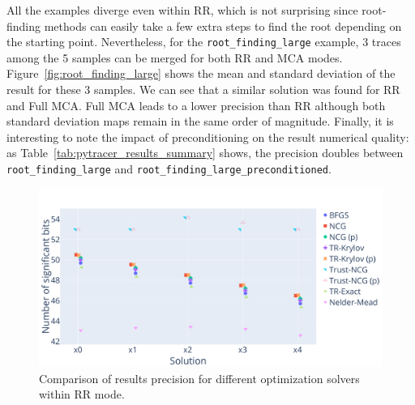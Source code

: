 All the examples diverge even within RR, which is not surprising since
root-finding methods can easily take a few extra steps to find the root
depending on the starting point. Nevertheless, for the
\texttt{root\_finding\_large} example, 3 traces among the 5 samples can be
merged for both RR and MCA modes. Figure~\ref{fig:root_finding_large} shows the
mean and standard deviation of the result for these 3 samples. We can see that a
similar solution was found for RR and Full MCA. Full MCA leads to a lower
precision than RR although both standard deviation maps remain in the same order
of magnitude. Finally, it is interesting to note the impact of preconditioning
on the result numerical quality: as Table~\ref{tab:pytracer_results_summary}
shows, the precision doubles between \texttt{root\_finding\_large} and
\texttt{root\_finding\_large\_preconditioned}.

\begin{figure}
    \centering
    \includegraphics[width=\linewidth]{figure/unconstrained_optimization_comparison.pdf}
    \caption{Comparison of results precision for different optimization solvers within RR mode.}
    \label{fig:unconstrained_optimization}
\end{figure}

